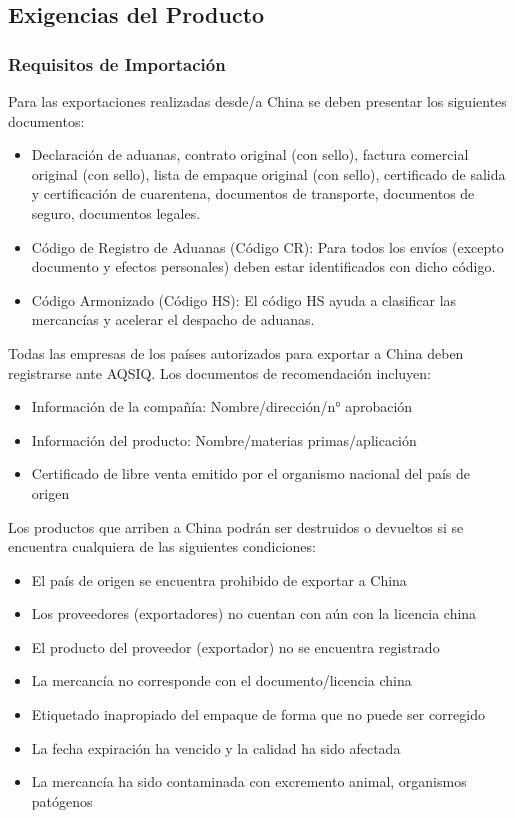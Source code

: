 \documentclass[
  stu,
  floatsintext,
  longtable,
  a4paper,
  nolmodern,
  notxfonts,
  notimes,
  12pt,
  colorlinks=true,linkcolor=blue,citecolor=blue,urlcolor=blue]{apa7}
\providecommand{\tightlist}{%
  \setlength{\itemsep}{0pt}\setlength{\parskip}{0pt}}
\begin{document}
\subsection{Exigencias del Producto}\label{exigencias-del-producto}

\subsubsection{Requisitos de
Importación}\label{requisitos-de-importaciuxf3n}

Para las exportaciones realizadas desde/a China se deben presentar los
siguientes documentos:

\begin{itemize}
\tightlist
\item
  Declaración de aduanas, contrato original (con sello), factura
  comercial original (con sello), lista de empaque original (con sello),
  certificado de salida y certificación de cuarentena, documentos de
  transporte, documentos de seguro, documentos legales.
\item
  Código de Registro de Aduanas (Código CR): Para todos los envíos
  (excepto documento y efectos personales) deben estar identificados con
  dicho código.
\item
  Código Armonizado (Código HS): El código HS ayuda a clasificar las
  mercancías y acelerar el despacho de aduanas.
\end{itemize}

Todas las empresas de los países autorizados para exportar a China deben
registrarse ante AQSIQ. Los documentos de recomendación incluyen:

\begin{itemize}
\tightlist
\item
  Información de la compañía: Nombre/dirección/n° aprobación
\item
  Información del producto: Nombre/materias primas/aplicación
\item
  Certificado de libre venta emitido por el organismo nacional del país
  de origen
\end{itemize}

Los productos que arriben a China podrán ser destruidos o devueltos si
se encuentra cualquiera de las siguientes condiciones:

\begin{itemize}
\tightlist
\item
  El país de origen se encuentra prohibido de exportar a China
\item
  Los proveedores (exportadores) no cuentan con aún con la licencia
  china
\item
  El producto del proveedor (exportador) no se encuentra registrado
\item
  La mercancía no corresponde con el documento/licencia china
\item
  Etiquetado inapropiado del empaque de forma que no puede ser corregido
\item
  La fecha expiración ha vencido y la calidad ha sido afectada
\item
  La mercancía ha sido contaminada con excremento animal, organismos
  patógenos
\end{itemize}
\end{document}
